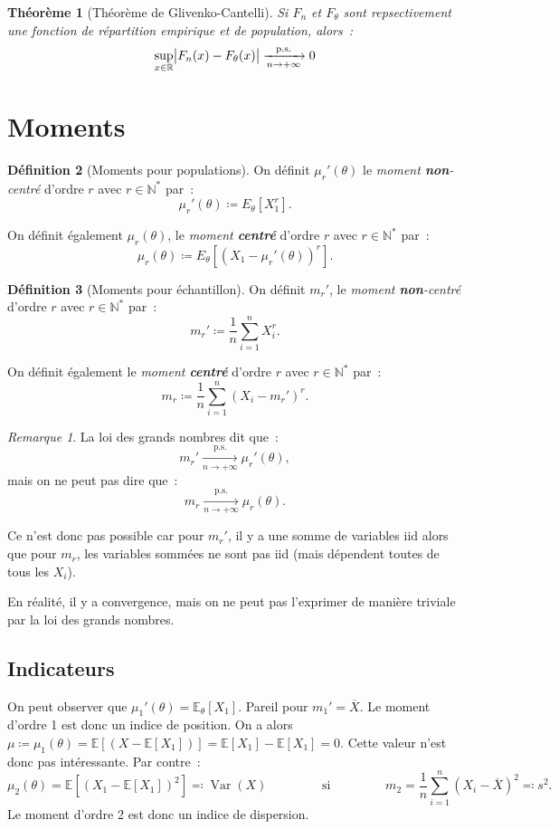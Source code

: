 \documentclass{report}
\DeclareMathOperator{\Var}{Var}
\newcommand{\E}{\mathbb E}
\newcommand{\pinfty}{{+\infty}}
\newcommand{\ps}{{\text{p.s.}}}
\newcommand{\cvgps}{\xrightarrow[n \to \pinfty]\ps}
\newcommand{\N}{\mathbb N}
\newcommand{\Ns}{\N^{*}}
\newcommand{\R}{\mathbb R}
\newtheorem{thm}{Théorème}[chapter]
\theoremstyle{definition}
\newtheorem{déf}[thm]{Définition}
\theoremstyle{remark}
\newtheorem*{rmq}{Remarque}
\begin{document}
		\begin{thm}[Théorème de Glivenko-Cantelli] Si $F_n$ et $F_\theta$ sont repsectivement une fonction de répartition empirique et de population, alors~:
		\[\sup_{x \in \R}\abs {F_n(x) - F_\theta(x)} \cvgps 0\]
		\end{thm}

	\section{Moments}
		\begin{déf}[Moments pour populations] On définit $\mu_r'(\theta)$ le \textit{moment \textbf{non}-centré} d'ordre $r$ avec $r \in \Ns$ par~:
		\[\mu_r'(\theta) \coloneqq E_\theta[X_1^r].\]

		On définit également $\mu_r(\theta)$, le \textit{moment \textbf{centré}} d'ordre $r$ avec $r \in \Ns$ par~:
		\[\mu_r(\theta) \coloneqq E_\theta\left[\left(X_1 - \mu_r'(\theta)\right)^r\right].\]
		\end{déf}

		\begin{déf}[Moments pour échantillon] On définit $m_r'$, le \textit{moment \textbf{non}-centré} d'ordre $r$ avec $r \in \Ns$ par~:
		\[m_r' \coloneqq \frac 1n\sum_{i=1}^n X_i^r.\]

		On définit également le \textit{moment \textbf{centré}} d'ordre $r$ avec $r \in \Ns$ par~:
		\[m_r \coloneqq \frac 1n\sum_{i=1}^n\left(X_i - m_r'\right)^r.\]
		\end{déf}

		\begin{rmq} La loi des grands nombres dit que~:
		\[m_r' \cvgps \mu_r'(\theta),\]
		mais on ne peut pas dire que~:
		\[m_r \cvgps \mu_r(\theta).\]

		Ce n'est donc pas possible car pour $m_r'$, il y a une somme de variables iid alors que pour $m_r$, les variables sommées ne sont pas iid (mais
		dépendent toutes de tous les $X_i$).

		En réalité, il y a convergence, mais on ne peut pas l'exprimer de manière triviale par la loi des grands nombres. \end{rmq}

		\subsection{Indicateurs}
			On peut observer que $\mu_1'(\theta) = \E_\theta[X_1]$. Pareil pour $m_1' = \overline X$. Le moment d'ordre 1 est donc un indice de position.
			On a alors $\mu \coloneqq \mu_1(\theta) = \E[(X - \E[X_1])] = \E[X_1] - \E[X_1] = 0$. Cette valeur n'est donc pas intéressante. Par contre~:
			\[\mu_2(\theta) = \E\left[(X_1 - \E[X_1])^2\right] \eqqcolon \Var(X) \qquad\qquad \text{ si }
				\qquad\qquad m_2 = \frac 1n\sum_{i=1}^n\left(X_i - \overline X\right)^2 \eqqcolon s^2.\]
			Le moment d'ordre 2 est donc un indice de dispersion.
\end{document}

